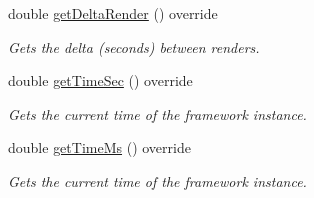\begin{DoxyCompactItemize}
double \hyperlink{classflounder_1_1glfwupdater_a3f8d8a108c8db0d2ead35088646687c9}{get\+Delta\+Render} () override
\begin{DoxyCompactList}\small\item\em Gets the delta (seconds) between renders. \end{DoxyCompactList}\item 
double \hyperlink{classflounder_1_1glfwupdater_a6982b83970693347bfa460adc04cf984}{get\+Time\+Sec} () override
\begin{DoxyCompactList}\small\item\em Gets the current time of the framework instance. \end{DoxyCompactList}\item 
double \hyperlink{classflounder_1_1glfwupdater_a1c3b884efb6e785143db556d4db9bdc8}{get\+Time\+Ms} () override
\begin{DoxyCompactList}\small\item\em Gets the current time of the framework instance. \end{DoxyCompactList}\end{DoxyCompactItemize}

